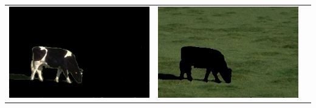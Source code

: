 \documentclass{article}
\begin{document}
\begin{center}
\begin{tabular}{c c c}
 \includegraphics[width=.4\linewidth]{../image-segmentation/output/add-Lab-neighbor-avg-feature/cow_seg1.jpg} & \includegraphics[width=.4\linewidth]{../image-segmentation/output/add-Lab-neighbor-avg-feature/cow_seg2.jpg} \\
  
 \end{tabular}
 
 
\end{center}
\end{document}
